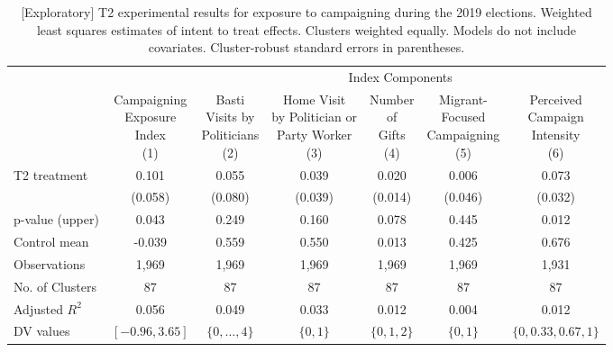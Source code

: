 \documentclass[
  11.5pt,
]{article}
\begin{document}
\begin{table}[!h]

\caption{\label{tab:unnamed-chunk-64}[Exploratory] T2 experimental results for exposure to campaigning during the 2019 elections. Weighted least squares estimates of intent to treat effects. Clusters weighted equally. Models do not include covariates. Cluster-robust standard errors in parentheses.}
\centering
\fontsize{10}{12}\selectfont
\begin{tabular}[t]{lcccccc}
\toprule
\multicolumn{1}{c}{} & \multicolumn{1}{c}{ } & \multicolumn{5}{c}{Index Components} \\
\cmidrule(l{3pt}r{3pt}){3-7}
 & \makecell[c]{Campaigning\\ Exposure\\ Index \\(1)} & \makecell[c]{Basti\\Visits by\\ Politicians \\(2)} & \makecell[c]{Home Visit\\ by Politician or\\ Party Worker  \\(3)} & \makecell[c]{Number\\ of\\ Gifts \\(4)} & \makecell[c]{Migrant-\\ Focused\\ Campaigning \\(5)} & \makecell[c]{Perceived\\ Campaign\\ Intensity \\(6)}\\
\midrule
T2 treatment & 0.101 & 0.055 & 0.039 & 0.020 & 0.006 & 0.073\\
 & (0.058) & (0.080) & (0.039) & (0.014) & (0.046) & (0.032)\\
\midrule
p-value (upper) & 0.043 & 0.249 & 0.160 & 0.078 & 0.445 & 0.012\\
Control mean & -0.039 & 0.559 & 0.550 & 0.013 & 0.425 & 0.676\\
Observations & 1,969 & 1,969 & 1,969 & 1,969 & 1,969 & 1,931\\
No. of Clusters & 87 & 87 & 87 & 87 & 87 & 87\\
Adjusted $R^2$ & 0.056 & 0.049 & 0.033 & 0.012 & 0.004 & 0.012\\
DV values & $[-0.96, 3.65]$ & $\{0, \ldots, 4\}$ & $\{0, 1\}$ & $\{0, 1, 2\}$ & $\{0, 1\}$ & $\{0, 0.33, 0.67, 1\}$\\
\bottomrule
\end{tabular}
\end{table}
\end{document}
